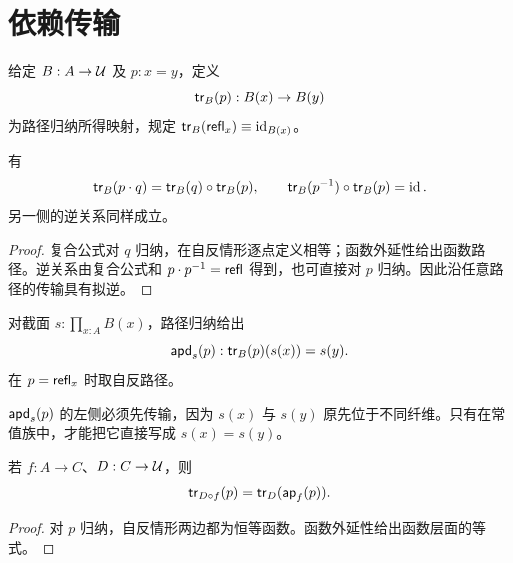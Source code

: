 \section{依赖传输}
\begin{definition}[传输]
给定 $B:A\to\mathcal U$ 及 $p:x=y$，定义
\[
\mathsf{tr}_B(p):B(x)\to B(y)
\]
为路径归纳所得映射，规定 $\mathsf{tr}_B(\mathsf{refl}_x)\equiv\operatorname{id}_{B(x)}$。
\end{definition}
\begin{proposition}[传输的复合与逆]
有
\[
\mathsf{tr}_B(p\cdot q)=\mathsf{tr}_B(q)\circ\mathsf{tr}_B(p),
\qquad
\mathsf{tr}_B(p^{-1})\circ\mathsf{tr}_B(p)=\operatorname{id}.
\]
另一侧的逆关系同样成立。
\end{proposition}
\begin{proof}
复合公式对 $q$ 归纳，在自反情形逐点定义相等；函数外延性给出函数路径。逆关系由复合公式和 $p\cdot p^{-1}=\mathsf{refl}$ 得到，也可直接对 $p$ 归纳。因此沿任意路径的传输具有拟逆。
\end{proof}
\begin{definition}[依赖路径作用]
对截面 $s:\prod_{x:A}B(x)$，路径归纳给出
\[
\mathsf{apd}_s(p):\mathsf{tr}_B(p)(s(x))=s(y).
\]
在 $p=\mathsf{refl}_x$ 时取自反路径。
\end{definition}
\begin{remark}
$\mathsf{apd}_s(p)$ 的左侧必须先传输，因为 $s(x)$ 与 $s(y)$ 原先位于不同纤维。只有在常值族中，才能把它直接写成 $s(x)=s(y)$。
\end{remark}
\begin{proposition}[拉回族的传输]
若 $f:A\to C$、$D:C\to\mathcal U$，则
\[
\mathsf{tr}_{D\circ f}(p)=\mathsf{tr}_D(\mathsf{ap}_f(p)).
\]
\end{proposition}
\begin{proof}
对 $p$ 归纳，自反情形两边都为恒等函数。函数外延性给出函数层面的等式。
\end{proof}

